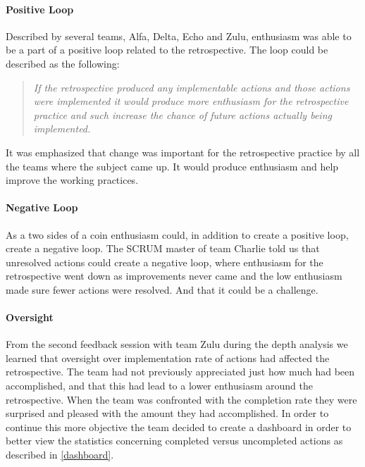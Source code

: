 \paragraph{Positive Loop}
Described by several teams, Alfa, Delta, Echo and Zulu, enthusiasm was able to be a part of a positive loop related to the retrospective. The loop could be described as the following:

\begin{quote}
\textit{If the retrospective produced any implementable actions and those actions were implemented it would produce more enthusiasm for the retrospective practice and such increase the chance of future actions actually being implemented.}
\end{quote}

It was emphasized that change was important for the retrospective practice by all the teams where the subject came up. It would produce enthusiasm and help improve the working practices. 

\paragraph{Negative Loop}
As a two sides of a coin enthusiasm could, in addition to create a positive loop, create a negative loop. The SCRUM master of team Charlie told us that unresolved actions could create a negative loop, where enthusiasm for the retrospective went down as improvements never came and the low enthusiasm made sure fewer actions were resolved. And that it could be a challenge. 

\paragraph{Oversight}
From the second feedback session with team Zulu during the depth analysis we learned that oversight over implementation rate of actions had affected the retrospective. The team had not previously appreciated just how much had been accomplished, and that this had lead to a lower enthusiasm around the retrospective. When the team was confronted with the completion rate they were surprised and pleased with the amount they had accomplished. In order to continue this more objective the team decided to create a dashboard in order to better view the statistics concerning completed versus uncompleted actions as described in \autoref{dashboard}. 

